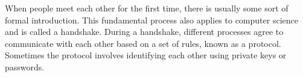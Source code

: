 
When people meet each other for the first time, there is usually some sort of formal introduction. This fundamental process also applies to computer science and is called a handshake. During a handshake, different processes agree to communicate with each other based on a set of rules, known as a protocol. Sometimes the protocol involves identifying each other using private keys or passwords.
